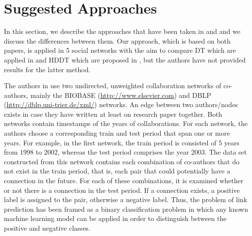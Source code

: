\documentclass{acm_proc_article-sp}
\begin{document}

\section{Suggested Approaches}

In this section, we describe the approaches that have been taken in \cite{Hasan06linkprediction} and \cite{Lichtenwalter:2010:NPM:1835804.1835837} and we discuss the differences between them. Our approach, which is based on both papers, is applied in 5 social networks with the aim to compare DT which are applied in \cite{Hasan06linkprediction} and HDDT which are proposed in \cite{Lichtenwalter:2010:NPM:1835804.1835837}, but the authors have not provided results for the latter method.


The authors in \cite{Hasan06linkprediction} use two undirected, unweighted collaboration networks of co-authors, mainly the BIOBASE (\url{http://www.elsevier.com}) and DBLP (\url{http://dblp.uni-trier.de/xml/}) networks. An edge between two authors/nodes exists in case they have written at least on research paper together. Both networks contain timestamps of the years of collaborations. For each network, the authors choose a corresponding train and test period that span one or more years. For example, in the first network, the train period is consisted of 5 years from 1998 to 2002, whereas the test period comprises the year 2003. The data set constructed from this network contains each combination of co-authors that do not exist in the train period, that is, each pair that could potentially have a connection in the future. For each of these combinations, it is examined whether or not there is a connection in the test period. If a connection exists, a positive label is assigned to the pair, otherwise a negative label. Thus, the problem of link prediction has been framed as a binary classification problem in which any known machine learning model can be applied in order to distinguish between the positive and negative classes.  
\end{document}
